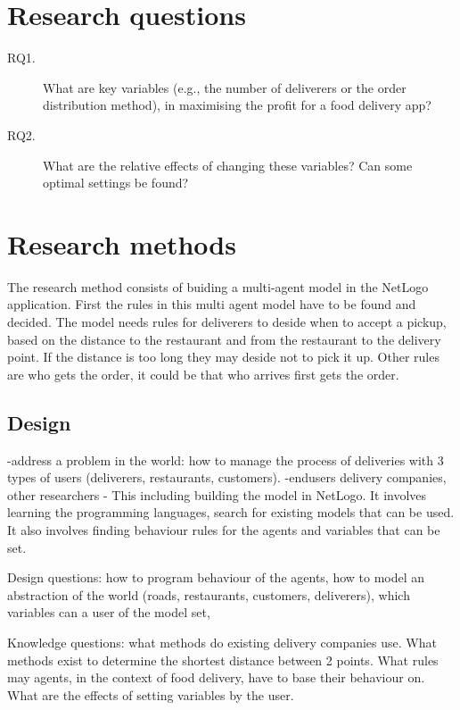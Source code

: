 \section{Research questions}

\begin{description}
    \item[RQ1.] What are key variables (e.g., the number of deliverers or the order distribution method), in maximising the profit for a food delivery app?
    \item[RQ2.] What are the relative effects of changing these variables? Can some optimal settings be found?
\end{description}

\section{Research methods}
The research method consists of buiding a multi-agent model in the NetLogo application.
First the rules in this multi agent model have to be found and decided.
The model needs rules for deliverers to deside when to accept a pickup, based on the distance to the restaurant and from the restaurant to the delivery point.
If the distance is too long they may deside not to pick it up.
Other rules are who gets the order, it could be that who arrives first gets the order.

\subsection{Design}
-address a problem in the world: how to manage the process of deliveries with 3 types of users (deliverers, restaurants, customers).
-endusers delivery companies, other researchers
-
This including building the model in NetLogo.
It involves learning the programming languages, search for existing models that can be used.
It also involves finding behaviour rules for the agents and variables that can be set.

Design questions: how to program behaviour of the agents, how to model an abstraction of the world (roads, restaurants, customers, deliverers),
which variables can a user of the model set,

Knowledge questions: what methods do existing delivery companies use.
What methods exist to determine the shortest distance between 2 points.
What rules may agents, in the context of food delivery, have to base their behaviour on.
What are the effects of setting variables by the user.


